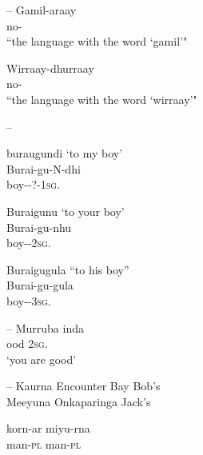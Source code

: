 \documentclass{langscibook}
\begin{document}
\begin{xlist}
--
\ea\label{ex:key:1}
\gll Gamil-araay \\
no- \\
\glt “the language with the word ‘gamil’"
\z



\ea\label{ex:key:2}
\gll Wirraay-dhurraay  \\
no- \\
\glt “the language with the word ‘wirraay’"                                 
\z
    





--
\ea\label{ex:key:3}
\begin{xlist}
\ex buraugundi
\glt `to my boy' \\
\ex 
\gll Burai-gu-N-dhi \\
boy--?-1\textsc{sg}. \\
\glt \citep[355]{gunther_lecture_1840}
\end{xlist}
\z

\ea\label{ex:key:4}
\begin{xlist}
\ex Buraigunu
\glt `to your boy' \\
\ex
\gll Burai-gu-nhu \\
boy--2\textsc{sg}. \\
\glt \citep[355]{gunther_lecture_1840}
\end{xlist}
\z

\ea\label{ex:key:5}
\begin{xlist}
\ex  Buraigugula
“to his boy” \\
\ex
\gll Burai-gu-gula \\
boy--3\textsc{sg}. \\
\glt \citep[355]{gunther_lecture_1840}
\end{xlist}
\z

--
\ea\label{ex:key:6}
\gll Murruba inda \\
ood 2\textsc{sg}. \\
\glt `you are good' \\
\citep[39]{ridley_kamilaroi_1875}
\z 	



--
\ea
\gll Kaurna     {Encounter Bay Bob’s} \\
	  Meeyuna {Onkaparinga Jack’s} \\
\z



\ea
\gll korn-ar	miyu-rna \\
	  man-\textsc{pl}   man-\textsc{pl} \\
\z








\end{xlist}
\end{document}
